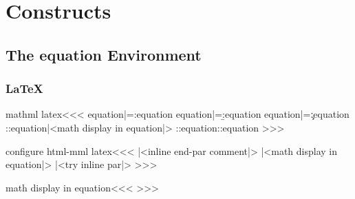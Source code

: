 %

\ifx \HTML\UnDef
   \def\HTML{mathml,html-mml} 
   \def\CONFIG{\jobname}
   \def\MAKETITLE{\author{Eitan M. Gurari}}
   \def\next{  \endinput}
   \expandafter\next
\fi





\chapter{Constructs}

\section{The equation Environment}


\subsection{LaTeX}


\<mathml latex\><<<
\let\A:equation|=\a:equation
\let\B:equation|=\b:equation
\let\C:equation|=\c:equation
  {\A:equation|<math display in equation|>}
  {\B:equation}{\C:equation}
>>>

\<configure html-mml latex\><<<
  {\IgnorePar|<inline end-par comment|>\EndP
   \IgnorePar
     |<math display in equation|>}
  {\ifvmode \IgnorePar\fi\EndP{}}
  {|<try inline par|>}
>>>

\<math display in equation\><<<
\Configure{$$}
   {\IgnorePar\EndP\DviMath}
   {\EndDviMath\EndP}
   {\DisplayMathtrue}%
>>>



